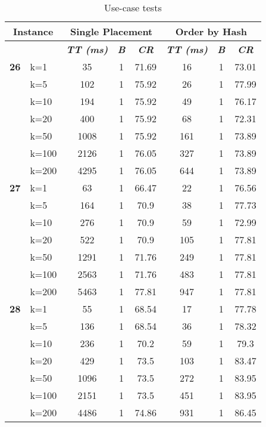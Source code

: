     \begin{table}[htbp]
    \caption{Use-case tests}
    \centering
    \begin{tabular}{|l|l|c|c|c|c|c|c|}
    
    \multicolumn{ 2}{|c|}{\textbf{Instance}} & \multicolumn{ 3}{c|}{\textbf{Single Placement}} & \multicolumn{ 3}{c|}{\textbf{Order by Hash}} \\ \hline
    \multicolumn{ 2}{|l|}{} & \textbf{\textit{TT (ms)}} & \textbf{\textit{B}} & \textbf{\textit{CR}} & \textbf{\textit{TT (ms)}} & \textbf{\textit{B}} & \textbf{\textit{CR}} \\ \hline
    \multicolumn{1}{|r|}{\textbf{26}} & k=1 & 35 & 1 & 71.69 & 16 & 1 & 73.01 \\ 
     & k=5 & 102 & 1 & 75.92 & 26 & 1 & 77.99 \\ 
     & k=10 & 194 & 1 & 75.92 & 49 & 1 & 76.17 \\ 
     & k=20 & 400 & 1 & 75.92 & 68 & 1 & 72.31 \\ 
     & k=50 & 1008 & 1 & 75.92 & 161 & 1 & 73.89 \\ 
     & k=100 & 2126 & 1 & 76.05 & 327 & 1 & 73.89 \\ 
     & k=200 & 4295 & 1 & 76.05 & 644 & 1 & 73.89 \\ \hline
    \multicolumn{1}{|r|}{\textbf{27}} & k=1 & 63 & 1 & 66.47 & 22 & 1 & 76.56 \\ 
     & k=5 & 164 & 1 & 70.9 & 38 & 1 & 77.73 \\ 
     & k=10 & 276 & 1 & 70.9 & 59 & 1 & 72.99 \\ 
     & k=20 & 522 & 1 & 70.9 & 105 & 1 & 77.81 \\ 
     & k=50 & 1291 & 1 & 71.76 & 249 & 1 & 77.81 \\ 
     & k=100 & 2563 & 1 & 71.76 & 483 & 1 & 77.81 \\ 
     & k=200 & 5463 & 1 & 77.81 & 947 & 1 & 77.81 \\ \hline
    \multicolumn{1}{|r|}{\textbf{28}} & k=1 & 55 & 1 & 68.54 & 17 & 1 & 77.78 \\ 
     & k=5 & 136 & 1 & 68.54 & 36 & 1 & 78.32 \\ 
     & k=10 & 236 & 1 & 70.2 & 59 & 1 & 79.3 \\ 
     & k=20 & 429 & 1 & 73.5 & 103 & 1 & 83.47 \\ 
     & k=50 & 1096 & 1 & 73.5 & 272 & 1 & 83.95 \\ 
     & k=100 & 2151 & 1 & 73.5 & 451 & 1 & 83.95 \\ 
     & k=200 & 4486 & 1 & 74.86 & 931 & 1 & 86.45 \\ \hline

\end{tabular}
\end{table}
